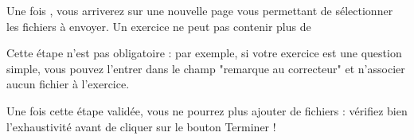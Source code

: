 ﻿Une fois , vous arriverez sur une nouvelle page vous permettant de sélectionner les fichiers à envoyer.
Un exercice ne peut pas contenir plus de %

Cette étape n'est pas obligatoire : par exemple, si votre exercice est une question simple, vous pouvez l'entrer dans le champ "remarque au correcteur" et n'associer aucun fichier à l'exercice.

Une fois cette étape validée, vous ne pourrez plus ajouter de fichiers : vérifiez bien l'exhaustivité avant de cliquer sur le bouton Terminer !